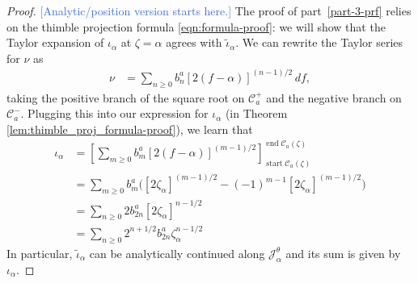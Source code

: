 \documentclass{article}
\newcommand{\fracderiv}[3]{\partial^{#1}_{#2, #3}}
\newcommand{\laplace}{\mathcal{L}}
\theoremstyle{definition}
\theoremstyle{plain}
\begin{document}
\begin{proof}
\textcolor{RoyalBlue}{[Analytic/position version starts here.]} The proof of part~\ref{part-3-prf} relies on the thimble projection formula \eqref{eqn:formula-proof}: we will show that the Taylor expansion of $\iota_\alpha$ at $\zeta=\alpha$ agrees with $\tilde{\iota}_\alpha$. We can rewrite the Taylor series for $\nu$ as
\begin{align*}
\nu & = \sum_{n \ge 0} b_n^a [2(f - \alpha)]^{(n - 1)/2}\,df,
\end{align*}
taking the positive branch of the square root on $\mathcal{C}^+_a$ and the negative branch on $\mathcal{C}^-_a$. Plugging this into our expression for $\iota_\alpha$ (in Theorem \ref{lem:thimble_proj_formula-proof}), we learn that
\begin{align*}
\iota_\alpha & = \left[ \sum_{m \ge 0} b_m^a [2(f - \alpha)]^{(m - 1)/2} \right]_{\operatorname{start} \mathcal{C}_a(\zeta)}^{\operatorname{end} \mathcal{C}_a(\zeta)} \\
& = \sum_{m \ge 0} b_m^a \Big( [2\zeta_\alpha]^{(m - 1)/2} - (-1)^{m-1}[2\zeta_\alpha]^{(m - 1)/2} \Big) \\
& = \sum_{n \ge 0} 2 b_{2n}^a [2\zeta_\alpha]^{n - 1/2} \\
& = \sum_{n \ge 0} 2^{n+1/2} b_{2n}^a \zeta_\alpha^{n - 1/2}
\end{align*}
In particular, $\tilde{\iota}_\alpha$ can be analytically continued along $\mathcal{J}_\alpha^\theta$ and its sum is given by $\iota_\alpha$. %


\end{proof}
\end{document}
